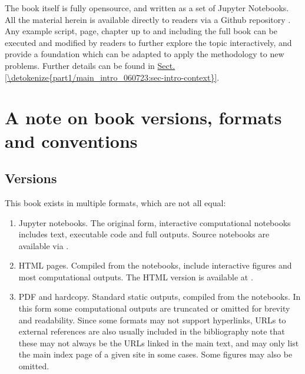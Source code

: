 \documentclass[letterpaper,table,10pt,english]{jupyterBook}
\begin{document}
\sphinxAtStartPar
The book itself is fully open\sphinxhyphen{}source, and written as a set of Jupyter Notebooks. All the material herein is available directly to readers via a Github repository . Any example script, page, chapter \sphinxhyphen{} up to and including the full book \sphinxhyphen{} can be executed and modified by readers to further explore the topic interactively, and provide a foundation which can be adapted to apply the methodology to new problems. Further details can be found in \hyperref[\detokenize{part1/main_intro_060723:sec-intro-context}]{Sect.\@ \ref{\detokenize{part1/main_intro_060723:sec-intro-context}}}.

\sphinxstepscope


\chapter{A note on book versions, formats and conventions}
\label{\detokenize{frontmatter/book_versions_note:a-note-on-book-versions-formats-and-conventions}}\label{\detokenize{frontmatter/book_versions_note:chpt-book-versions}}\label{\detokenize{frontmatter/book_versions_note::doc}}

\section{Versions}
\label{\detokenize{frontmatter/book_versions_note:versions}}
\sphinxAtStartPar
This book exists in multiple formats, which are not all equal:
\begin{enumerate}
%
\item {} 
\sphinxAtStartPar
Jupyter notebooks. The original form, interactive computational notebooks includes text, executable code and full outputs. Source notebooks are available via .

\item {} 
\sphinxAtStartPar
HTML pages. Compiled from the notebooks, include interactive figures and most computational outputs. The HTML version is available at .

\item {} 
\sphinxAtStartPar
PDF and hard\sphinxhyphen{}copy. Standard static outputs, compiled from the notebooks. In this form some computational outputs are truncated or omitted for brevity and readability. Since some formats may not support hyperlinks, URLs to external references are also usually included in the bibliography \sphinxhyphen{} note that these may not always be the  URLs linked in the main text, and may only list the main index page of a given site in some cases. Some figures may also be omitted.

\end{enumerate}
\end{document}
